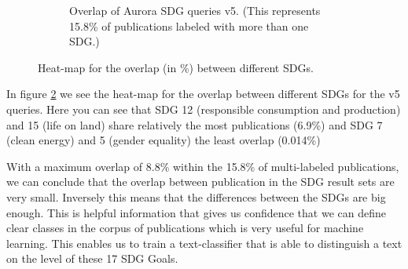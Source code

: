 \documentclass{article}
\begin{document}
\begin{figure}[H]
\begin{subfigure}{0.49\textwidth}
	    \caption{Overlap of Aurora SDG queries v5. (This represents 15.8\% of publications labeled with more than one SDG.)}
	    \label{heatmapoverlapv5}
    \end{subfigure}
    \caption{Heat-map for the overlap (in \%) between different SDGs.}
\end{figure}



In  figure \ref{heatmapoverlapv5} we see the heat-map for the overlap between different SDGs for the v5 queries. Here you can see that SDG 12 (responsible consumption and production) and 15 (life on land) share relatively the most publications (6.9\%) and SDG 7 (clean energy) and 5 (gender equality) the least overlap (0.014\%)



With a maximum overlap of 8.8\% within the 15.8\% of multi-labeled publications, we can conclude that the overlap between publication in the SDG result sets are very small. Inversely this means that the differences between the SDGs are big enough. This is helpful information that gives us confidence that we can define clear classes in the corpus of publications which is very useful for machine learning. This enables us to train a text-classifier that is able to distinguish a text on the level of these 17 SDG Goals.
\end{document}
